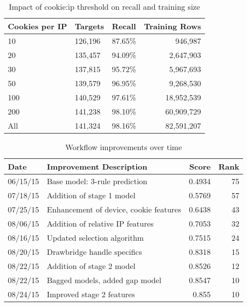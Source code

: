 \documentclass[9pt, journal]{IEEEtran}
\begin{document}


\begin{table}[H]
\centering
\begin{tabular}{l l l r}
\hline
\textbf{Cookies per IP} & \textbf{Targets} & \textbf{Recall} & \textbf{Training Rows} \\
\hline
10 & 126,196 & 87.65\% & 946,987 \tabularnewline
20 & 135,457 & 94.09\% & 2,647,903 \tabularnewline
30 & 137,815 & 95.72\% & 5,967,693 \tabularnewline
50 & 139,579 & 96.95\% & 9,268,530 \tabularnewline
100 & 140,529 & 97.61\% & 18,952,539 \tabularnewline
200 & 141,238 & 98.10\% & 60,909,729 \tabularnewline
All & 141,324 & 98.16\% & 82,591,207 \tabularnewline
\hline
\end{tabular}
\caption{Impact of cookie:ip threshold on recall and training size}\label{table:cookiesPerIp}
\end{table}

\begin{table}[H]
\centering
\begin{tabular}{l l r r}
\hline
\textbf{Date} & \textbf{Improvement Description} & \textbf{Score} & \textbf{Rank} \tabularnewline
\hline
06/15/15 & Base model: 3-rule prediction & 0.4934 & 75 \tabularnewline
07/18/15 & Addition of stage 1 model & 0.5769 & 57 \tabularnewline
07/25/15 & Enhancement of device, cookie features & 0.6438 & 43 \tabularnewline
08/06/15 & Addition of relative IP features & 0.7053 & 32 \tabularnewline
08/16/15 & Updated selection algorithm & 0.7515 & 24 \tabularnewline
08/20/15 & Drawbridge handle specifics & 0.8318 & 15 \tabularnewline
08/22/15 & Addition of stage 2 model & 0.8526 & 12 \tabularnewline
08/22/15 & Bagged models, added gap model & 0.8547 & 10 \tabularnewline
08/24/15 & Improved stage 2 features & 0.855 & 10 \tabularnewline
\hline
\end{tabular}
\caption{Workflow improvements over time}\label{table:leaderboard}
\end{table}


% 
% 
% 
% 
\end{document}
